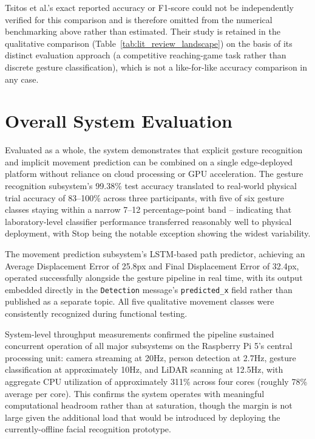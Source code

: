 Tsitos et al.'s exact reported accuracy or F1-score could not be independently verified for this comparison and is therefore omitted from the numerical benchmarking above rather than estimated. Their study is retained in the qualitative comparison (Table~\ref{tab:lit_review_landscape}) on the basis of its distinct evaluation approach (a competitive reaching-game task rather than discrete gesture classification), which is not a like-for-like accuracy comparison in any case.

\section{Overall System Evaluation}

Evaluated as a whole, the system demonstrates that explicit gesture recognition and
implicit movement prediction can be combined on a single edge-deployed platform
without reliance on cloud processing or GPU acceleration. The gesture recognition
subsystem's 99.38\% test accuracy translated to real-world physical trial accuracy of
83--100\% across three participants, with five of six gesture classes staying within
a narrow 7--12 percentage-point band -- indicating that laboratory-level classifier
performance transferred reasonably well to physical deployment, with Stop being the
notable exception showing the widest variability.

The movement prediction subsystem's LSTM-based path predictor, achieving an Average
Displacement Error of 25.8px and Final Displacement Error of 32.4px, operated
successfully alongside the gesture pipeline in real time, with its output embedded
directly in the \texttt{Detection} message's \texttt{predicted\_x} field rather than
published as a separate topic. All five qualitative movement classes were
consistently recognized during functional testing.

System-level throughput measurements confirmed the pipeline sustained concurrent
operation of all major subsystems on the Raspberry Pi 5's central processing unit:
camera streaming at 20Hz, person detection at 2.7Hz, gesture classification at
approximately 10Hz, and LiDAR scanning at 12.5Hz, with aggregate CPU utilization of
approximately 311\% across four cores (roughly 78\% average per core). This confirms
the system operates with meaningful computational headroom rather than at saturation,
though the margin is not large given the additional load that would be introduced by
deploying the currently-offline facial recognition prototype.


